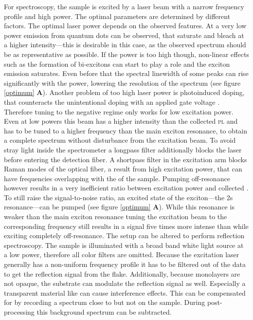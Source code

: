 For \pl spectroscopy, the sample is excited by a laser beam with a narrow frequency profile and high power. The optimal parameters are determined by different factors. The optimal laser power depends on the observed features. At a very low power emission from quantum dots can be observed, that saturate and bleach at a higher intensity---this is desirable in this case, as the observed spectrum should be as representative as possible. If the power is too high though, non-linear effects such as the formation of bi-excitons can start to play a role and the exciton emission saturates. Even before that the spectral linewidth of some peaks can rise significantly with the power, lowering the resolution of the spectrum (see figure \ref{optimum} \textbf{A}). Another problem of too high laser power is photoinduced doping, that counteracts the unintentional doping with an applied gate voltage \cite{wang_photoinduced_2016,cunningham_photoinduced_2017}. Therefore tuning to the negative regime only works for low excitation power. Even at low powers this beam has a higher intensity than the collected \textsc{pl} and has to be tuned to a higher frequency than the main exciton resonance, to obtain a complete spectrum without disturbance from the excitation beam. To avoid stray light inside the spectrometer a longpass filter additionally blocks the laser before entering the detection fiber. A shortpass filter in the excitation arm blocks Raman modes of the optical fiber, a result from high excitation power, that can have frequencies overlapping with the \pl of the sample. Pumping off-resonance however results in a very inefficient ratio between excitation power and collected \pl\!. To still raise the signal-to-noise ratio, an excited state of the exciton---the 2s resonance---can be pumped (see figure \ref{optimum} \textbf{A}). While this resonance is weaker than the main exciton resonance tuning the excitation beam to the corresponding frequency still results in a signal five times more intense than while exciting completely off-resonance.
The setup can be altered to perform reflection spectroscopy. The sample is illuminated with a broad band white light source at a low power, therefore all color filters are omitted. Because the excitation laser generally has a non-uniform frequency profile it has to be filtered out of the data to get the reflection signal from the \wse flake. Additionally, because \tmdg monolayers are not opaque, the substrate can modulate the reflection signal as well. Especially a transparent material like \hbng can cause interference effects. This can be compensated for by recording a spectrum close to but not on the sample. During post-processing this background spectrum can be subtracted.

